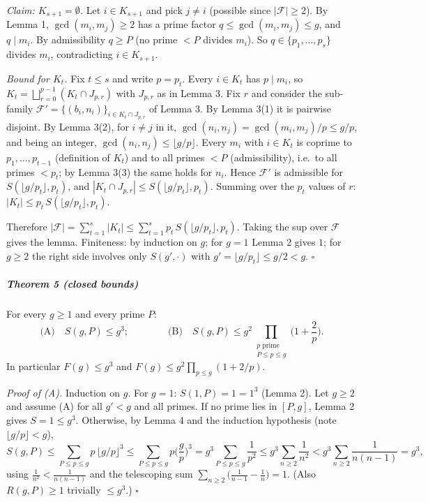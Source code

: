 \emph{Claim: \(K_{s+1}=\emptyset\).} Let \(i\in K_{s+1}\) and pick
\(j\ne i\) (possible since \(|\mathcal F|\ge2\)). By Lemma 1,
\(\gcd(m_i,m_j)\ge2\) has a prime factor \(q\le\gcd(m_i,m_j)\le g\), and
\(q\mid m_i\). By admissibility \(q\ge P\) (no prime \(<P\) divides
\(m_i\)). So \(q\in\{p_1,\dots,p_s\}\) divides \(m_i\), contradicting
\(i\in K_{s+1}\).

\emph{Bound for \(K_t\).} Fix \(t\le s\) and write \(p=p_t\). Every
\(i\in K_t\) has \(p\mid m_i\), so
\(K_t=\bigsqcup_{r=0}^{p-1}(K_t\cap J_{p,r})\) with \(J_{p,r}\) as in
Lemma 3. Fix \(r\) and consider the sub-family
\(\mathcal F'=\{(b_i,n_i)\}_{i\in K_t\cap J_{p,r}}\) of Lemma 3. By
Lemma 3(1) it is pairwise disjoint. By Lemma 3(2), for \(i\ne j\) in it,
\(\gcd(n_i,n_j)=\gcd(m_i,m_j)/p\le g/p\), and being an integer,
\(\gcd(n_i,n_j)\le\lfloor g/p\rfloor\). Every \(m_i\) with \(i\in K_t\)
is coprime to \(p_1,\dots,p_{t-1}\) (definition of \(K_t\)) and to all
primes \(<P\) (admissibility), i.e.~to all primes \(<p_t\); by Lemma
3(3) the same holds for \(n_i\). Hence \(\mathcal F'\) is admissible for
\(S(\lfloor g/p_t\rfloor,p_t)\), and
\(|K_t\cap J_{p,r}|\le S(\lfloor g/p_t\rfloor,p_t)\). Summing over the
\(p_t\) values of \(r\): \(|K_t|\le p_t\,S(\lfloor g/p_t\rfloor,p_t)\).

Therefore
\(|\mathcal F|=\sum_{t=1}^{s}|K_t|\le\sum_{t=1}^{s}p_t\,S(\lfloor g/p_t\rfloor,p_t)\).
Taking the sup over \(\mathcal F\) gives the lemma. Finiteness: by
induction on \(g\); for \(g=1\) Lemma 2 gives \(1\); for \(g\ge2\) the
right side involves only \(S(g',\cdot)\) with
\(g'=\lfloor g/p_t\rfloor\le g/2<g\). \(\square\)

\subparagraph{Theorem 5 (closed bounds)}\label{theorem-5-closed-bounds}

For every \(g\ge1\) and every prime \(P\):
\[\text{(A)}\quad S(g,P)\le g^{3};\qquad\qquad \text{(B)}\quad S(g,P)\le g^{2}\prod_{\substack{p \text{ prime}\\ P\le p\le g}}\Big(1+\frac{2}{p}\Big).\]
In particular \(F(g)\le g^3\) and \(F(g)\le g^2\prod_{p\le g}(1+2/p)\).

\emph{Proof of (A).} Induction on \(g\). For \(g=1\): \(S(1,P)=1=1^3\)
(Lemma 2). Let \(g\ge2\) and assume (A) for all \(g'<g\) and all primes.
If no prime lies in \([P,g]\), Lemma 2 gives \(S=1\le g^3\). Otherwise,
by Lemma 4 and the induction hypothesis (note \(\lfloor g/p\rfloor<g\)),
\[S(g,P)\le\sum_{P\le p\le g}p\,\lfloor g/p\rfloor^{3}\le\sum_{P\le p\le g}p\Big(\frac gp\Big)^{3}=g^{3}\sum_{P\le p\le g}\frac1{p^{2}}\le g^{3}\sum_{n\ge2}\frac1{n^{2}}< g^{3}\sum_{n\ge2}\frac1{n(n-1)}=g^{3},\]
using \(\frac1{n^2}<\frac1{n(n-1)}\) and the telescoping sum
\(\sum_{n\ge2}\big(\frac1{n-1}-\frac1n\big)=1\). (Also \(R(g,P)\ge 1\)
trivially \(\le g^3\).) \(\square\)

